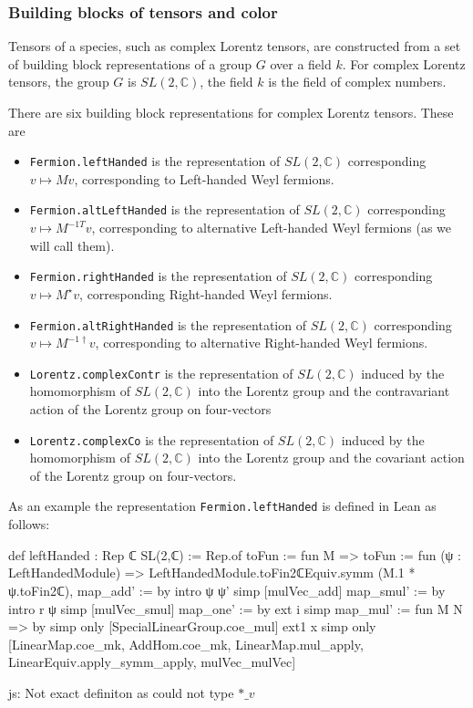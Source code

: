 \documentclass[a4paper, 11pt]{article}
\newcommand{\js}[1]{ {\color{magenta} js:  #1}}
\begin{document}
\subsubsection{Building blocks of tensors and color}

Tensors of a species, such as complex Lorentz tensors, are constructed from a 
set of building block representations of a group $G$ over a field $k$.
For complex Lorentz tensors, the group $G$ is $SL(2, \mathbb{C})$, the field $k$ is the 
field of complex numbers. 

There are six building block representations for complex Lorentz tensors. These are
\begin{itemize}
  \item \lstinline|Fermion.leftHanded| is the
   representation of $SL(2, \mathbb{C})$ corresponding 
      $v \mapsto M v$, corresponding to Left-handed Weyl fermions.
  \item \lstinline|Fermion.altLeftHanded| is the
  representation of $SL(2, \mathbb{C})$ corresponding 
     $v \mapsto M^{-1 T} v$, corresponding to alternative Left-handed Weyl fermions (as we will 
     call them).
  \item \lstinline|Fermion.rightHanded| is the representation of $SL(2, \mathbb{C})$ corresponding 
  $v \mapsto M^\star v$, corresponding Right-handed Weyl fermions.
  \item \lstinline|Fermion.altRightHanded| is the representation of $SL(2, \mathbb{C})$ corresponding
  $v \mapsto M^{-1 \dagger} v$, corresponding to alternative Right-handed Weyl fermions.
  \item \lstinline|Lorentz.complexContr| is the representation of $SL(2, \mathbb{C})$ 
   induced by the homomorphism of $SL(2, \mathbb{C})$ into the Lorentz group and the contravariant 
   action of the Lorentz group on four-vectors
  \item \lstinline|Lorentz.complexCo| is the representation of $SL(2, \mathbb{C})$
    induced by the homomorphism of $SL(2, \mathbb{C})$ into the Lorentz group and the covariant
    action of the Lorentz group on four-vectors.
\end{itemize}
As an example the representation \lstinline|Fermion.leftHanded| is defined in Lean as follows:
\begin{code}
def leftHanded : Rep ℂ SL(2,ℂ) := Rep.of {
    toFun := fun M => {
      toFun := fun (ψ : LeftHandedModule) =>
        LeftHandedModule.toFin2ℂEquiv.symm (M.1 * ψ.toFin2ℂ),
      map_add' := by
        intro ψ ψ'
        simp [mulVec_add]
      map_smul' := by
        intro r ψ
        simp [mulVec_smul]}
    map_one' := by
      ext i
      simp
    map_mul' := fun M N => by
      simp only [SpecialLinearGroup.coe_mul]
      ext1 x
      simp only [LinearMap.coe_mk, AddHom.coe_mk, LinearMap.mul_apply, LinearEquiv.apply_symm_apply,
        mulVec_mulVec]}  
\end{code} \js{Not exact definiton as could not type $*\_v$}
\end{document}
